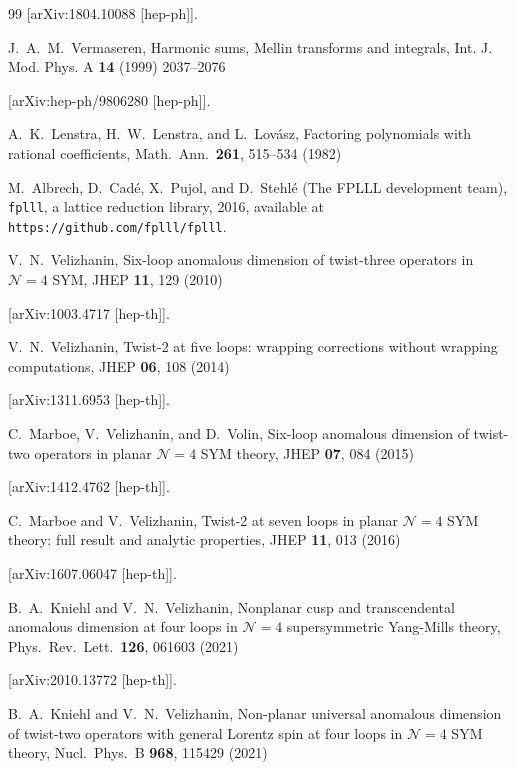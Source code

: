 \documentclass[
 twocolumn,
 superscriptaddress,
 preprintnumbers,
 nofootinbib,
 amsmath,amssymb,
 aps,
 prl
 ]{revtex4-2}
\begin{document}
\begin{thebibliography}{99}
[arXiv:1804.10088 [hep-ph]].



J.~A.~M.~Vermaseren,
Harmonic sums, Mellin transforms and integrals,
Int. J. Mod. Phys. A \textbf{14} (1999) 2037--2076

[arXiv:hep-ph/9806280 [hep-ph]].


A.~K.~Lenstra, H.~W.~Lenstra, and L.~Lov\'asz,
Factoring polynomials with rational coefficients,
Math.\ Ann.\ {\bf 261}, 515--534 (1982)



M.~Albrech, D.~Cad\'{e}, X.~Pujol, and D.~Stehl\'{e} (The {FPLLL} development team),
\texttt{fplll}, a lattice reduction library, 2016,
available at {\tt https://github.com/fplll/fplll}.


V.~N.~Velizhanin,
Six-loop anomalous dimension of twist-three operators in $\mathcal{N}=4$ SYM,
JHEP \textbf{11}, 129 (2010)

[arXiv:1003.4717 [hep-th]].



V.~N.~Velizhanin,
Twist-2 at five loops: wrapping corrections without wrapping computations,
JHEP \textbf{06}, 108 (2014)

[arXiv:1311.6953 [hep-th]].



C.~Marboe, V.~Velizhanin, and D.~Volin,
Six-loop anomalous dimension of twist-two operators in planar $\mathcal{N}=4$ SYM theory,
JHEP \textbf{07}, 084 (2015)

[arXiv:1412.4762 [hep-th]].



C.~Marboe and V.~Velizhanin,
Twist-2 at seven loops in planar $\mathcal{N}=4$ SYM theory: full result and analytic properties,
JHEP \textbf{11}, 013 (2016)

[arXiv:1607.06047 [hep-th]].



B.~A.~Kniehl and V.~N.~Velizhanin,
Nonplanar cusp and transcendental anomalous dimension at four loops in $\mathcal{N}=4$ supersymmetric Yang-Mills theory,
Phys.\ Rev.\ Lett.\ \textbf{126}, 061603 (2021)

[arXiv:2010.13772 [hep-th]].



B.~A.~Kniehl and V.~N.~Velizhanin,
Non-planar universal anomalous dimension of twist-two operators with general Lorentz spin at four loops in $\mathcal{N}=4$ SYM theory,
Nucl.\ Phys.\ B \textbf{968}, 115429 (2021)


\end{thebibliography}
\end{document}
